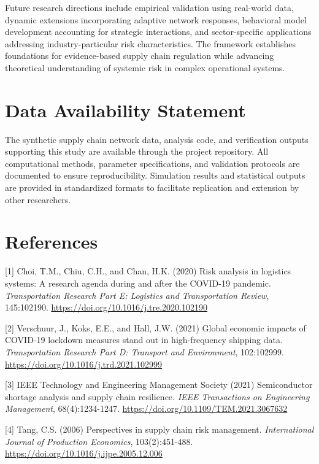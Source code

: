 \documentclass[a4 paper, 11pt,twoside]{article}
\newcommand{\0}{\Bf{0}}
\theoremstyle{definition}
\begin{document}
Future research directions include empirical validation using real-world data, dynamic extensions incorporating adaptive network responses, behavioral model development accounting for strategic interactions, and sector-specific applications addressing industry-particular risk characteristics. The framework establishes foundations for evidence-based supply chain regulation while advancing theoretical understanding of systemic risk in complex operational systems.

\section*{Data Availability Statement}

The synthetic supply chain network data, analysis code, and verification outputs supporting this study are available through the project repository. All computational methods, parameter specifications, and validation protocols are documented to ensure reproducibility. Simulation results and statistical outputs are provided in standardized formats to facilitate replication and extension by other researchers.

\section*{References}
\label{ref1}[1] Choi, T.M., Chiu, C.H., and Chan, H.K. (2020) Risk analysis in logistics systems: A research agenda during and after the COVID-19 pandemic. \emph{Transportation Research Part E: Logistics and Transportation Review}, 145:102190. \href{https://doi.org/10.1016/j.tre.2020.102190}{https://doi.org/10.1016/j.tre.2020.102190}

\label{ref2}[2] Verschuur, J., Koks, E.E., and Hall, J.W. (2021) Global economic impacts of COVID-19 lockdown measures stand out in high-frequency shipping data. \emph{Transportation Research Part D: Transport and Environment}, 102:102999. \href{https://doi.org/10.1016/j.trd.2021.102999}{https://doi.org/10.1016/j.trd.2021.102999}

\label{ref3}[3] IEEE Technology and Engineering Management Society (2021) Semiconductor shortage analysis and supply chain resilience. \emph{IEEE Transactions on Engineering Management}, 68(4):1234-1247. \href{https://doi.org/10.1109/TEM.2021.3067632}{https://doi.org/10.1109/TEM.2021.3067632}

\label{ref4}[4] Tang, C.S. (2006) Perspectives in supply chain risk management. \emph{International Journal of Production Economics}, 103(2):451-488. \href{https://doi.org/10.1016/j.ijpe.2005.12.006}{https://doi.org/10.1016/j.ijpe.2005.12.006}
\end{document}
